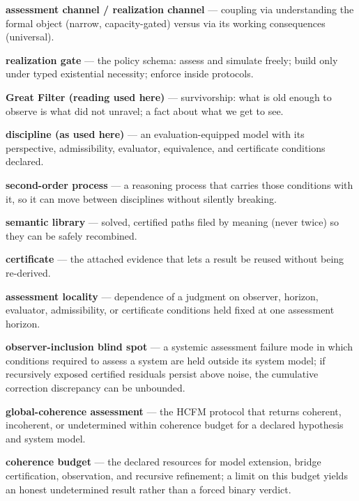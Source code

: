 \documentclass[11pt]{article}
\theoremstyle{definition}
\begin{document}
\noindent\textbf{assessment channel / realization channel} --- coupling via understanding the formal object (narrow, capacity-gated) versus via its working consequences (universal).

\noindent\textbf{realization gate} --- the policy schema: assess and simulate freely; build only under typed existential necessity; enforce inside protocols.

\noindent\textbf{Great Filter (reading used here)} --- survivorship: what is old enough to observe is what did not unravel; a fact about what we get to see.

\noindent\textbf{discipline (as used here)} --- an evaluation-equipped model with its perspective, admissibility, evaluator, equivalence, and certificate conditions declared.

\noindent\textbf{second-order process} --- a reasoning process that carries those conditions with it, so it can move between disciplines without silently breaking.

\noindent\textbf{semantic library} --- solved, certified paths filed by meaning (never twice) so they can be safely recombined.

\noindent\textbf{certificate} --- the attached evidence that lets a result be reused without being re-derived.

\noindent\textbf{assessment locality} --- dependence of a judgment on observer, horizon, evaluator, admissibility, or certificate conditions held fixed at one assessment horizon.

\noindent\textbf{observer-inclusion blind spot} --- a systemic assessment failure mode in which conditions required to assess a system are held outside its system model; if recursively exposed certified residuals persist above noise, the cumulative correction discrepancy can be unbounded.

\noindent\textbf{global-coherence assessment} --- the HCFM protocol that returns coherent, incoherent, or undetermined within coherence budget for a declared hypothesis and system model.

\noindent\textbf{coherence budget} --- the declared resources for model extension, bridge certification, observation, and recursive refinement; a limit on this budget yields an honest undetermined result rather than a forced binary verdict.
\end{document}
